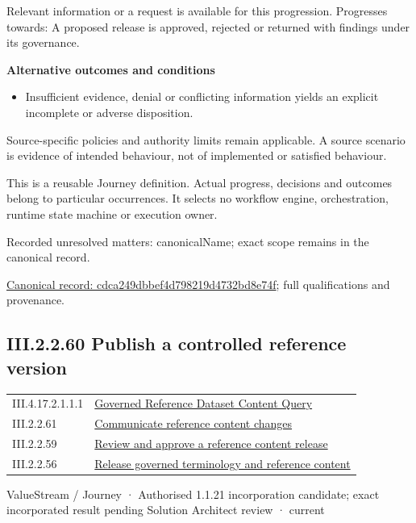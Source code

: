 Relevant information or a request is available for this progression. Progresses towards: A proposed release is approved, rejected or returned with findings under its governance.



\par\medskip\textbf{Alternative outcomes and conditions}\par


\begin{itemize}


\item Insufficient evidence, denial or conflicting information yields an explicit incomplete or adverse disposition.

\end{itemize}


Source-specific policies and authority limits remain applicable. A source scenario is evidence of intended behaviour, not of implemented or satisfied behaviour.



This is a reusable Journey definition. Actual progress, decisions and outcomes belong to particular occurrences. It selects no workflow engine, orchestration, runtime state machine or execution owner.


{\small Recorded unresolved matters: canonicalName; exact scope remains in the canonical record.}\par
{\footnotesize \href{../../../../../../../continuum/strategy/value-stream/cdca249dbbef4d798219d4732bd8e74f.md}{Canonical record: cdca249dbbef4d798219d4732bd8e74f}; full qualifications and provenance.}\par
\subsection*{III.2.2.60 Publish a controlled reference version}
\label{navigation:III.2.2.60}

\begin{longtable}{p{.22\linewidth}p{.73\linewidth}}
III.4.17.2.1.1.1 & \hyperref[element:625ef1036a7442b2b8aed06f72b8afff]{Governed Reference Dataset Content Query} \\
III.2.2.61 & \hyperref[element:9faf0704382e4b428814c2e9bf72eec0]{Communicate reference content changes} \\
III.2.2.59 & \hyperref[element:cdca249dbbef4d798219d4732bd8e74f]{Review and approve a reference content release} \\
III.2.2.56 & \hyperref[element:e9a8a77c5f9c4361af4dfcfa607ece2d]{Release governed terminology and reference content} \\
\end{longtable}
\label{element:156eb857d5c14baaae1c1cc59fe3490b}
{\small ValueStream / Journey · Authorised 1.1.21 incorporation candidate; exact incorporated result pending Solution Architect review · current}\par

